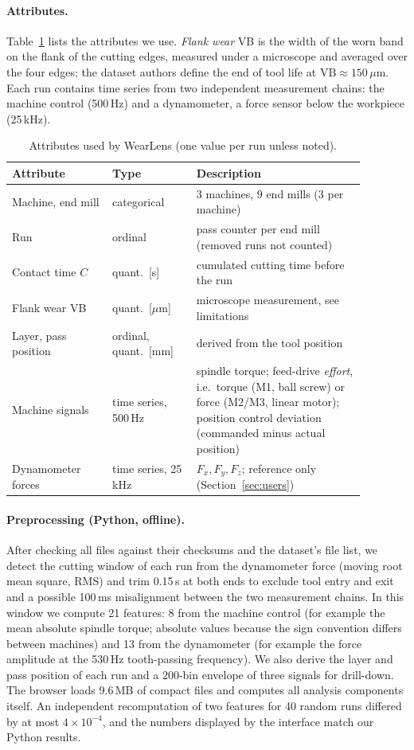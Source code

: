 \paragraph{Attributes.}
Table~\ref{tab:data} lists the attributes we use. \emph{Flank wear} VB is the width of the worn band on
the flank of the cutting edges, measured under a microscope and averaged over the four edges; the dataset
authors define the end of tool life at $\mathrm{VB}\approx150\,\mu$m. Each run contains time series from
two independent measurement chains: the machine control (500\,Hz) and a dynamometer, a force sensor below
the workpiece (25\,kHz).

\begin{table}[t]
\centering\small
\caption{Attributes used by WearLens (one value per run unless noted).}
\label{tab:data}
\begin{tabular}{@{}p{0.25\linewidth}p{0.21\linewidth}p{0.42\linewidth}@{}}
\toprule
Attribute & Type & Description \\
\midrule
Machine, end mill & categorical & 3 machines, 9 end mills (3 per machine) \\
Run & ordinal & pass counter per end mill (removed runs not counted) \\
Contact time $C$ & quant.\ [s] & cumulated cutting time before the run \\
Flank wear VB & quant.\ [$\mu$m] & microscope measurement, see limitations \\
Layer, pass position & ordinal, quant.\ [mm] & derived from the tool position \\
Machine signals & time series, 500\,Hz & spindle torque; feed-drive \emph{effort}, i.e.\ torque (M1, ball screw) or force (M2/M3, linear motor); position control deviation (commanded minus actual position) \\
Dynamometer forces & time series, 25\,kHz & $F_x, F_y, F_z$; reference only (Section~\ref{sec:users}) \\
\bottomrule
\end{tabular}
\end{table}

\paragraph{Preprocessing (Python, offline).}
After checking all files against their checksums and the dataset's file list, we detect the cutting window of
each run from the dynamometer force (moving root mean square, RMS) and trim 0.15\,s at both ends to exclude
tool entry and exit and a possible 100\,ms misalignment between the two measurement chains. In this window
we compute 21 features: 8 from the machine control (for example the mean absolute spindle torque; absolute
values because the sign convention differs between machines) and 13 from the dynamometer (for example the
force amplitude at the 530\,Hz tooth-passing frequency). We also derive the layer and pass position of each
run and a 200-bin envelope of three signals for drill-down. The browser loads 9.6\,MB of compact files and
computes all analysis components itself. An independent recomputation of two features for 40 random runs
differed by at most $4\times10^{-4}$, and the numbers displayed by the interface match our Python results.


